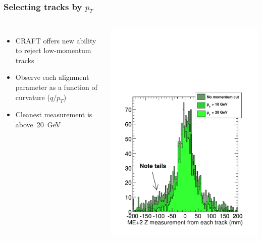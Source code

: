 \documentclass[compress]{beamer}
\begin{document}
\begin{frame}
\frametitle{Selecting tracks by $p_T$}

\begin{columns}

\begin{itemize}
\item CRAFT offers new ability to reject low-momentum tracks
\item Observe each alignment parameter as a function of curvature ($q/p_T$)
\item Cleanest measurement is \mbox{above 20~GeV\hspace{-1 cm}}
\end{itemize}

\begin{center}
\includegraphics[width=0.75\linewidth]{measurement_from_each_track.pdf}
\end{center}


\end{columns}
\end{frame}
\end{document}
